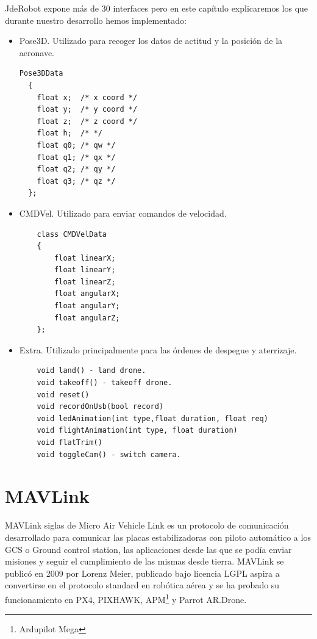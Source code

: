 JdeRobot expone más de 30 interfaces pero en este cap\'itulo explicaremos los que durante nuestro desarrollo hemos implementado:
\begin{itemize}
\item Pose3D. Utilizado para recoger los datos de actitud y la posici\'on de la aeronave.
{\scriptsize
\begin{verbatim}
Pose3DData
  {
	float x;  /* x coord */
	float y;  /* y coord */
	float z;  /* z coord */
  	float h;  /* */
	float q0; /* qw */
	float q1; /* qx */
	float q2; /* qy */
	float q3; /* qz */
  };
\end{verbatim}}
\item CMDVel. Utilizado para enviar comandos de velocidad.
{\scriptsize
\begin{verbatim}
	class CMDVelData
	{
		float linearX;
		float linearY;
		float linearZ;
		float angularX;
		float angularY;
		float angularZ;										
	};

\end{verbatim}}
\item Extra. Utilizado principalmente para las \'ordenes de despegue y aterrizaje.
{\scriptsize
\begin{verbatim}
    void land() - land drone. 
    void takeoff() - takeoff drone. 
    void reset() 
    void recordOnUsb(bool record) 
    void ledAnimation(int type,float duration, float req) 
    void flightAnimation(int type, float duration) 
    void flatTrim() 
    void toggleCam() - switch camera. 
\end{verbatim}}

\end{itemize}

\section{MAVLink}
\label{sec:mavlink}

MAVLink siglas de Micro Air Vehicle Link es un protocolo de comunicaci\'on desarrollado para comunicar las placas estabilizadoras con piloto automático a los GCS o Ground control station, las aplicaciones desde las que se podía enviar misiones y seguir el cumplimiento de las mismas desde tierra.
MAVLink se public\'o en 2009 por Lorenz Meier, publicado bajo licencia LGPL aspira a convertirse en el protocolo standard en rob\'otica aérea y se ha probado su funcionamiento en PX4, PIXHAWK, APM\footnote{Ardupilot Mega} y Parrot AR.Drone.

